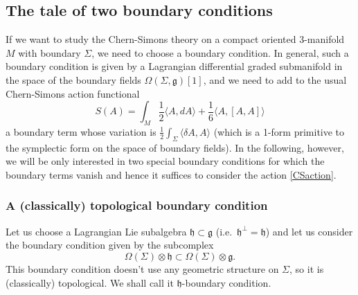 \documentclass[a4paper]{amsart}
\theoremstyle{plain}
\theoremstyle{definition}
\newcommand{\g}{\mathfrak{g}}
\newcommand{\h}{\mathfrak{h}}
\newcommand{\la}{\langle}
\newcommand{\ra}{\rangle}
\begin{document}
\subsection{The tale of two boundary conditions}
If we want to study the Chern-Simons theory on a compact oriented 3-manifold $M$ with boundary $\Sigma$, we need to choose a boundary condition. In general, such a boundary condition is given by a Lagrangian differential graded submanifold in the space of the boundary fields $\Omega(\Sigma,\g)[1]$, and we need to add to the usual Chern-Simons action functional
\begin{equation}\label{CSaction}
S(A) = \int_M \frac12 \la A,dA \ra + \frac16 \la A, [A,A] \ra
\end{equation}
a boundary term whose variation is $\frac12\int_\Sigma\la\delta A,A\ra$ (which is a 1-form primitive to the symplectic form on the space of boundary fields). 
In the following, however, we will be only interested in two special boundary conditions for which the  boundary terms  vanish and hence it suffices to consider the action \eqref{CSaction}.

\subsubsection{A (classically) topological boundary condition}
Let us choose a Lagrangian Lie subalgebra $\h\subset\g$ (i.e.\ $\h^\perp=\h$) and let us consider the boundary condition given by the subcomplex
\begin{equation}\label{h-bc}
\Omega(\Sigma)\otimes\h\subset\Omega(\Sigma)\otimes\g.
\end{equation}
This boundary condition doesn't use any geometric structure on $\Sigma$, so it is (classically) topological.%
We shall call it $\h$-boundary condition.
\end{document}
